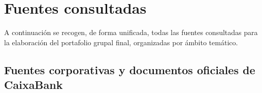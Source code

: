 
\chapter*{Fuentes consultadas}

A continuación se recogen, de forma unificada, todas las fuentes consultadas
para la elaboración del portafolio grupal final, organizadas por ámbito temático.

\section*{Fuentes corporativas y documentos oficiales de CaixaBank}

